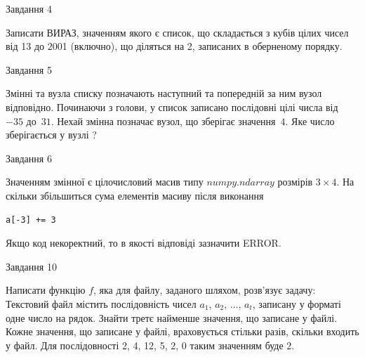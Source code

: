 \documentclass[12pt, ukrainian]{article}
\begin{document}
{\begin{minipage}[t]{8.0cm}
\end{minipage}


               
{\begin{center}Завдання {4}\end{center}}
\vspace{-4mm}

Записати ВИРАЗ, значенням якого є список, що складається з кубів цілих чисел від 13 до 2001 (включно), що діляться на 2, записаних в обернено\-му порядку.\par

\vspace{10mm}
               
{\begin{center}Завдання {5}\end{center}}
\vspace{-4mm}
Змінні  та  вузла списку позначають наступний та попередній за ним вузол відповідно. Починаючи з голови, у список записано послідовні цілі числа від~$-35$ до~$31$. Нехай змінна  позначає вузол, що зберігає значення~$4$.
Яке число зберігається у вузлі  ?\par

               
{\begin{center}Завдання {6}\end{center}}
\vspace{-4mm}
Значенням змінної  є цілочисловий масив типу $numpy.ndarray$ розмірів $3{\times}4$. На скільки збільшиться сума елементів масиву  після виконання
\begin{verbatim}
a[-3] += 3
\end{verbatim}


Якщо код некоректний, то в якості відповіді зазначити ERROR.\par

               
{\begin{center}Завдання {10}\end{center}}
\vspace{-4mm}

Написати функцію $f$, яка для файлу, заданого шляхом, розв’язує задачу:\\ Текстовий файл містить послідовність чисел $a_1$, $a_2$, $\ldots$, $a_t$, записану у форматі одне число на рядок. Знайти третє найменше значення, що записане у файлі. Кожне значення, що записане у файлі, враховується стільки разів, скільки входить у файл. Для послідовності 2, 4, 12, 5, 2, 0 таким значенням буде 2.

}
\end{document}
